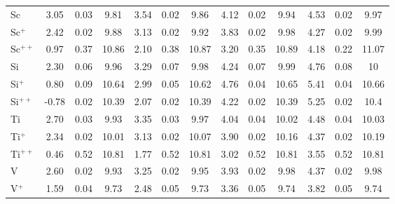 \begin{longtable}{l!{\vrule width 0.25pt}ccc!{\vrule width 0.25pt}ccc!{\vrule width 0.25pt}ccc!{\vrule width 0.25pt}ccc}
Sc & 3.05 & 0.03 & 9.81 & 3.54 & 0.02 & 9.86 & 4.12 & 0.02 & 9.94 & 4.53 & 0.02 & 9.97 \\
Sc$^+$ & 2.42 & 0.02 & 9.88 & 3.13 & 0.02 & 9.92 & 3.83 & 0.02 & 9.98 & 4.27 & 0.02 & 9.99 \\
Sc$^{++}$ & 0.97 & 0.37 & 10.86 & 2.10 & 0.38 & 10.87 & 3.20 & 0.35 & 10.89 & 4.18 & 0.22 & 11.07 \\
Si & 2.30 & 0.06 & 9.96 & 3.29 & 0.07 & 9.98 & 4.24 & 0.07 & 9.99 & 4.76 & 0.08 & 10 \\
Si$^+$ & 0.80 & 0.09 & 10.64 & 2.99 & 0.05 & 10.62 & 4.76 & 0.04 & 10.65 & 5.41 & 0.04 & 10.66 \\
Si$^{++}$ & -0.78 & 0.02 & 10.39 & 2.07 & 0.02 & 10.39 & 4.22 & 0.02 & 10.39 & 5.25 & 0.02 & 10.4 \\
Ti & 2.70 & 0.03 & 9.93 & 3.35 & 0.03 & 9.97 & 4.04 & 0.04 & 10.02 & 4.48 & 0.04 & 10.03 \\
Ti$^+$ & 2.34 & 0.02 & 10.01 & 3.13 & 0.02 & 10.07 & 3.90 & 0.02 & 10.16 & 4.37 & 0.02 & 10.19 \\
Ti$^{++}$ & 0.46 & 0.52 & 10.81 & 1.77 & 0.52 & 10.81 & 3.02 & 0.52 & 10.81 & 3.55 & 0.52 & 10.81 \\
V & 2.60 & 0.02 & 9.93 & 3.25 & 0.02 & 9.95 & 3.93 & 0.02 & 9.98 & 4.37 & 0.02 & 9.98 \\
V$^+$ & 1.59 & 0.04 & 9.73 & 2.48 & 0.05 & 9.73 & 3.36 & 0.05 & 9.74 & 3.82 & 0.05 & 9.74 \\
\end{longtable}


\clearpage


